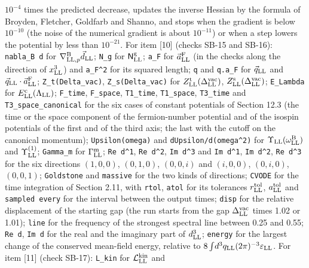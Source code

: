 \documentclass[
  10pt,
]{article}
\begin{document}
\(10^{-4}\) times the predicted decrease, updates the inverse Hessian by
the formula of Broyden, Fletcher, Goldfarb and Shanno, and stops when
the gradient is below \(10^{-10}\) (the noise of the numerical gradient
is about \(10^{-11}\)) or when a step lowers the potential by less than
\(10^{-21}\). For item {[}10{]} (checks SB-15 and SB-16):
\texttt{nabla\_B\ d} for \(\nabla^{\rm B}_{{\rm LL},p}\vec d_{\rm LL}\);
\texttt{N\_g} for \(\mathsf N^{\rm g}_{\rm LL}\); \texttt{a\_F} for
\(\vec a^{\rm F}_{\rm LL}\) (in the checks along the direction of
\(x^3_{\rm LL}\)) and \texttt{\textbar{}a\_F\textbar{}\^{}2} for its
squared length; \texttt{q} and \texttt{q.a\_F} for \(\vec q_{\rm LL}\)
and \(\vec q_{\rm LL}\cdot\vec a^{\rm F}_{\rm LL}\);
\texttt{Z\_t(Delta\_vac)}, \texttt{Z\_s(Delta\_vac)} for
\(Z^{\rm t}_{\rm LL}(\Delta^{\rm vac}_{\rm LL})\),
\(Z^{\rm s}_{\rm LL}(\Delta^{\rm vac}_{\rm LL})\); \texttt{E\_Lambda}
for \(E^{\rm c}_{\rm LL}(\Lambda_{\rm LL})\); \texttt{F\_time},
\texttt{F\_space}, \texttt{T1\_time}, \texttt{T1\_space},
\texttt{T3\_time} and \texttt{T3\_space\_canonical} for the six cases of
constant potentials of Section 12.3 (the time or the space component of
the fermion-number potential and of the isospin potentials of the first
and of the third axis; the last with the cutoff on the canonical
momentum); \texttt{Upsilon(omega)} and \texttt{dUpsilon/d(omega\^{}2)}
for \(\Upsilon_{\rm LL}(\omega^{\rm B}_{\rm LL})\) and
\(\Upsilon^{(1)}_{\rm LL}\); \texttt{Gamma\_m} for
\(\Gamma^{\rm m}_{\rm LL}\); \texttt{Re\ d\^{}1}, \texttt{Re\ d\^{}2},
\texttt{Im\ d\^{}3} and \texttt{Im\ d\^{}1}, \texttt{Im\ d\^{}2},
\texttt{Re\ d\^{}3} for the six directions \((1,0,0)\), \((0,1,0)\),
\((0,0,i)\) and \((i,0,0)\), \((0,i,0)\), \((0,0,1)\);
\texttt{Goldstone} and \texttt{massive} for the two kinds of directions;
\texttt{CVODE} for the time integration of Section 2.11, with
\texttt{rtol}, \texttt{atol} for its tolerances
\(r^{\rm tol}_{\rm LL}\), \(a^{\rm tol}_{\rm LL}\) and
\texttt{sampled\ every} for the interval between the output times;
\texttt{disp} for the relative displacement of the starting gap (the run
starts from the gap \(\Delta^{\rm vac}_{\rm LL}\) times 1.02 or 1.01);
\texttt{line} for the frequency of the strongest spectral line between
0.25 and 0.55; \texttt{Re\ d}, \texttt{Im\ d} for the real and the
imaginary part of \(d^3_{\rm LL}\); \texttt{energy} for the largest
change of the conserved mean-field energy, relative to
\(8\int\!d^3q_{\rm LL}(2\pi)^{-3}\varepsilon_{\rm LL}\). For item
{[}11{]} (check SB-17): \texttt{L\_kin} for
\(\mathcal L^{\rm kin}_{\rm LL}\) and
\end{document}
